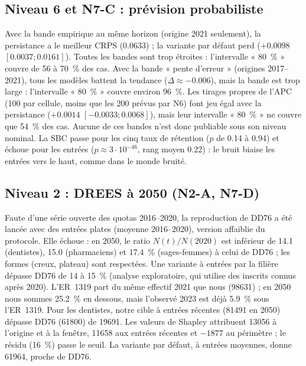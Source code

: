 \subsection{Niveau 6 et N7-C : prévision probabiliste}
Avec la bande empirique au même horizon (origine 2021 seulement), la persistance a le meilleur CRPS
(\num{0.0633}\mesure{}) ; la variante par défaut perd ($+\num{0.0098}$ $[\num{0.0037} ; \num{0.0161}]$).
Toutes les bandes sont trop étroites : l'intervalle « 80~\% » couvre de 56 à 70\mesure{}~\% des cas.
Avec la bande « pente d'erreur » (origines 2017--2021), tous les modèles battent la tendance
($\Delta \approx -\num{0.006}$\mesure{}), mais la bande est trop large : l'intervalle « 80~\% »
couvre environ 96\mesure{}~\%. Les tirages propres de l'APC (100 par cellule, moins que les 200
prévus par N6) font jeu égal avec la persistance ($+\num{0.0014}$ $[\num{-0.0033} ; \num{0.0068}]$),
mais leur intervalle « 80~\% » ne couvre que 54\mesure{}~\% des cas. Aucune de ces bandes n'est donc publiable sous son niveau nominal. La SBC passe
pour les cinq taux de rétention ($p$ de \num{0.14} à \num{0.94}\mesure{}) et échoue pour les entrées
($p \approx 3 \cdot 10^{-46}$\mesure{}, rang moyen \num{0.22}) : le bruit biaise les entrées vers le
haut, comme dans le monde bruité.

\subsection{Niveau 2 : DREES à 2050 (N2-A, N7-D)}
Faute d'une série ouverte des quotas 2016--2020, la reproduction de DD76 a été lancée avec des
entrées plates (moyenne 2016--2020), version affaiblie du protocole. Elle échoue : en 2050, le ratio
$N(t)/N(2020)$ est inférieur de \num{14.1} (dentistes), \num{15.0} (pharmaciens) et \num{17.4}\mesure{}~\%
(sages-femmes) à celui de DD76 ; les formes (creux, plateau) sont respectées. Une variante à entrées
par la filière dépasse DD76 de 14 à 15\mesure{}~\% (analyse exploratoire, qui utilise des inscrits
connus après 2020). L'ER~1319 part du même effectif 2021 que nous (\num{98631}\mesure{}) ; en 2050 nous
sommes \num{25.2}\mesure{}~\% en dessous, mais l'observé 2023 est déjà \num{5.9}\mesure{}~\% sous
l'ER~1319. Pour les dentistes, notre cible à entrées récentes (\num{81491}\mesure{} en 2050) dépasse
DD76 (\num{61800}) de \num{19691}. Les valeurs de Shapley attribuent \num{13056}\mesure{} à l'origine et
à la fenêtre, \num{11658}\mesure{} aux entrées récentes et $-\num{1877}$\mesure{} au périmètre ; le résidu
(16\derive{}~\%) passe le seuil. La variante par défaut, à entrées moyennes, donne
\num{61964}\mesure{}, proche de DD76.

